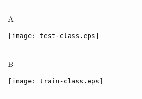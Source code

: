 \documentclass{minimal}
\renewcommand\big{\fontsize{10pt}{10pt}\selectfont}
\begin{document}
\begin{tabular}{lllll}

	\begin{minipage}[t][][t]{0.10cm} {\vspace{-1.7cm} \big\textsf{A}} \end{minipage}
	\begin{minipage}[b][][b]{10.0cm} {\centering \texttt{[image: test-class.eps]}} \end{minipage}\\

	\begin{minipage}[t][][t]{0.10cm} {\vspace{-1.7cm} \big\textsf{B}} \end{minipage}
	\begin{minipage}[b][][b]{10.0cm} {\centering \texttt{[image: train-class.eps]}} \end{minipage}

\end{tabular}
\end{document}
